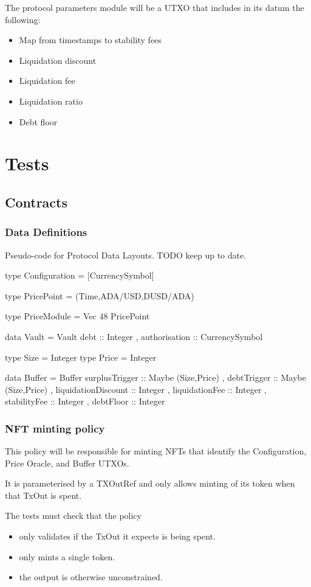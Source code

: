 \documentclass{article} %
\begin{document}
The protocol parameters module will be a UTXO that includes in its datum the following:
\begin{itemize}
  \item Map from timestamps to stability fees
  \item Liquidation discount
  \item Liquidation fee
  \item Liquidation ratio
  \item Debt floor
\end{itemize}

\section{Tests}

\subsection{Contracts}

\subsubsection{Data Definitions}
Pseudo-code for Protocol Data Layouts. TODO keep up to date.

type Configuration = [CurrencySymbol]

type PricePoint = (Time,ADA/USD,DUSD/ADA)

type PriceModule = Vec 48 PricePoint

data Vault =
  Vault {
    debt :: Integer
  , authorisation :: CurrencySymbol
  }

type Size = Integer
type Price = Integer

data Buffer =
  Buffer {
    surplusTrigger :: Maybe (Size,Price)
  , debtTrigger :: Maybe (Size,Price)
  , liquidationDiscount :: Integer
  , liquidationFee :: Integer
  , stabilityFee :: Integer
  , debtFloor :: Integer
  }

\subsubsection{NFT minting policy}
This policy will be responsible for minting NFTs that identify the Configuration, Price Oracle, and Buffer UTXOs.

It is parameterised by a TXOutRef and only allows minting of its token when that TxOut is spent.

The tests must check that the policy
\begin{itemize}
  \item only validates if the TxOut it expects is being spent.
  \item only mints a single token.
  \item the output is otherwise unconstrained.
\end{itemize}
\end{document}

